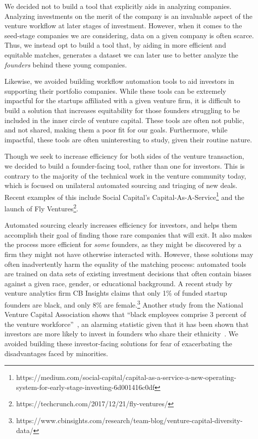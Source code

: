 We decided not to build a tool that explicitly aids in analyzing companies. Analyzing investments on the merit of the company is an invaluable aspect of the venture workflow at later stages of investment. However, when it comes to the seed-stage companies we are considering, data on a given company is often scarce. Thus, we instead opt to build a tool that, by aiding in more efficient and equitable matches, generates a dataset we can later use to better analyze the \textit{founders} behind these young companies.

Likewise, we avoided building workflow automation tools to aid investors in supporting their portfolio companies. While these tools can be extremely impactful for the startups affiliated with a given venture firm, it is difficult to build a solution that increases equitability for those founders struggling to be included in the inner circle of venture capital. These tools are often not public, and not shared, making them a poor fit for our goals. Furthermore, while impactful, these tools are often uninteresting to study, given their routine nature.

Though we seek to increase efficiency for both sides of the venture transaction, we decided to build a founder-facing tool, rather than one for investors. This is contrary to the majority of the technical work in the venture community today, which is focused on unilateral automated sourcing and triaging of new deals. Recent examples of this include Social Capital's Capital-As-A-Service\footnote{https://medium.com/social-capital/capital-as-a-service-a-new-operating-system-for-early-stage-investing-6d001416c0df} and the launch of Fly Ventures\footnote{https://techcrunch.com/2017/12/21/fly-ventures/}.

Automated sourcing clearly increases efficiency for investors, and helps them accomplish their goal of finding those rare companies that will exit. It also makes the process more efficient for \textit{some} founders, as they might be discovered by a firm they might not have otherwise interacted with. However, these solutions may often inadvertently harm the equality of the matching process: automated tools are trained on data sets of existing investment decisions that often contain biases against a given race, gender, or educational background. A recent study by venture analytics firm CB Insights claims that only 1\% of funded startup founders are black, and only 8\% are female.\footnote{https://www.cbinsights.com/research/team-blog/venture-capital-diversity-data/} Another study from the National Venture Capital Association shows that ``black employees comprise 3 percent of the venture workforce''~\cite{nvca-diversity}, an alarming statistic given that it has been shown that investors are more likely to invest in founders who share their ethnicity~\cite{BENGTSSON2015338}. We avoided building these investor-facing solutions for fear of exacerbating the disadvantages faced by minorities.

